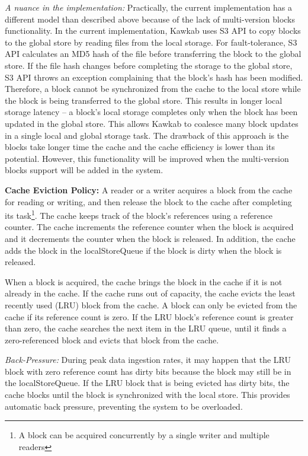 \documentclass[]{article}
\newcommand{\subtopic}[1]{\vspace{1.5pt} \noindent \textbf{#1}}
\begin{document}
\textit{A nuance in the implementation:} Practically, the current
implementation has a different model than described above because of the lack
of multi-version blocks functionality. In the current implementation, Kawkab
uses S3 API to copy blocks to the global store by reading files from the local
storage. For fault-tolerance, S3 API calculates an MD5 hash of the file before
transferring the block to the global store. If the file hash changes before
completing the storage to the global store, S3 API throws an exception
complaining that the block's hash has been modified. Therefore, a block cannot
be synchronized from the cache to the local store while the block is being
transferred to the global store. This results in longer local storage latency
-- a block's local storage completes only when the block has been updated in
the global store. This allows Kawkab to coalesce many block updates in a single
local and global storage task. The drawback of this approach is the blocks take
longer time the cache and the cache efficiency is lower than its potential.
However, this functionality will be improved when the multi-version blocks
support will be added in the system.

\subtopic{Cache Eviction Policy:}
A reader or a writer acquires a block from the cache for reading or writing,
and then release the block to the cache after completing its task\footnote{A
block can be acquired concurrently by a single writer and multiple readers}. 
The cache keeps track of the block's references using a reference counter. The
cache increments the reference counter when the block is acquired and it
decrements the counter when the block is released. In addition, the cache adds
the block in the localStoreQueue if the block is dirty when the block is
released.

When a block is acquired, the cache brings the block in the cache if it is not
already in the cache. If the cache runs out of capacity, the cache evicts the
least recently used (LRU) block from the cache.  A block can only be evicted
from the cache if its reference count is zero. If the LRU block's reference
count is greater than zero, the cache searches the next item in the LRU
queue, until it finds a zero-referenced block and evicts that block from the
cache.

\textit{Back-Pressure:}
During peak data ingestion rates, it may happen that the LRU block with
zero reference count has dirty bits because the block may still be in the
localStoreQueue. If the LRU block that is being evicted has dirty bits,
the cache blocks until the block is synchronized with the local store.
This provides automatic back pressure, preventing the system to be
overloaded.
\end{document}
